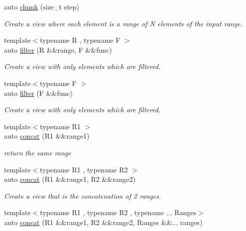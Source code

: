 \begin{DoxyCompactItemize}
auto \mbox{\hyperlink{namespacerah_1_1view_ab29a0945581f92240cbcc9f81811c08b}{chunk}} (size\+\_\+t step)
\begin{DoxyCompactList}\small\item\em Create a view where each element is a range of N elements of the input range. \end{DoxyCompactList}\item 
{\footnotesize template$<$typename R , typename F $>$ }\\auto \mbox{\hyperlink{namespacerah_1_1view_a1eade9e2861e5bdae07b01ac9bf2c10c}{filter}} (R \&\&range, F \&\&func)
\begin{DoxyCompactList}\small\item\em Create a view with only elements which are filtered. \end{DoxyCompactList}\item 
{\footnotesize template$<$typename F $>$ }\\auto \mbox{\hyperlink{namespacerah_1_1view_a315ba2143c833b24d05481c68b6cf2da}{filter}} (F \&\&func)
\begin{DoxyCompactList}\small\item\em Create a view with only elements which are filtered. \end{DoxyCompactList}\item 
{\footnotesize template$<$typename R1 $>$ }\\auto \mbox{\hyperlink{namespacerah_1_1view_ad7cd13dd36976288286478b47c3f5747}{concat}} (R1 \&\&range1)
\begin{DoxyCompactList}\small\item\em return the same range \end{DoxyCompactList}\item 
{\footnotesize template$<$typename R1 , typename R2 $>$ }\\auto \mbox{\hyperlink{namespacerah_1_1view_a114597b820b9ca8f3c286f026f818399}{concat}} (R1 \&\&range1, R2 \&\&range2)
\begin{DoxyCompactList}\small\item\em Create a view that is the concatenation of 2 ranges. \end{DoxyCompactList}\item 
{\footnotesize template$<$typename R1 , typename R2 , typename ... Ranges$>$ }\\auto \mbox{\hyperlink{namespacerah_1_1view_a830061cf022e907eefb65aba6a35573d}{concat}} (R1 \&\&range1, R2 \&\&range2, Ranges \&\&... ranges)
\item 

\end{DoxyCompactItemize}
